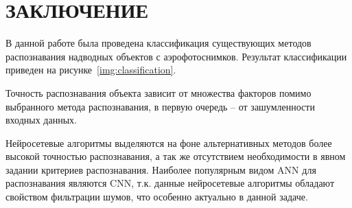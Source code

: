 \chapter*{ЗАКЛЮЧЕНИЕ}

В данной работе была проведена классификация существующих методов распознавания надводных объектов с аэрофотоснимков. Результат классификации приведен на рисунке~\ref{img:classification}.

Точность распознавания объекта зависит от множества факторов помимо выбранного метода распознавания, в первую очередь -- от зашумленности входных данных. 

Нейросетевые алгоритмы выделяются на фоне альтернативных методов более высокой точностью распознавания, а так же отсутствием необходимости в явном задании критериев распознавания. Наиболее популярным видом ANN для распознавания являются CNN, т.к. данные нейросетевые алгоритмы обладают свойством фильтрации шумов, что особенно актуально в данной задаче.